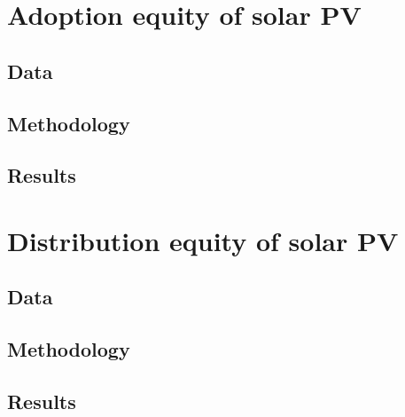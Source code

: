 \documentclass[12pt,twoside,letterpaper]{article}
\begin{document}
\newpage
\section[Adoption equity]{Adoption equity of solar PV}

\subsection{Data}


\subsection{Methodology}
\subsection{Results}


\newpage
\section[Distribution equity]{Distribution equity of solar PV}

\subsection{Data}
\subsection{Methodology}



\subsection{Results}
\end{document}
